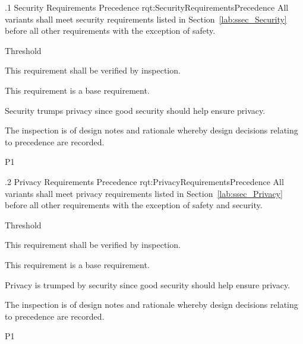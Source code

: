 \ONERQMTV
{\RqtNumberBase.1}
{Security Requirements Precedence}
{rqt:SecurityRequirementsPrecedence}
{All \ThisSystem variants shall meet security requirements listed in Section~\ref{lab:ssec_Security} before all other requirements with the exception of safety.}
{
	\item [Phase 1] Threshold
}
{This requirement shall be verified by inspection.}
{
	\item [N/A] This requirement is a base requirement.
}
{
	\item Security trumps privacy since good security should help ensure privacy.
	\item The inspection is of design notes and rationale whereby design decisions relating to precedence are recorded.
}
{P1}

\ONERQMTV
{\RqtNumberBase.2}
{Privacy Requirements Precedence}
{rqt:PrivacyRequirementsPrecedence}
{All \ThisSystem variants shall meet privacy requirements listed in Section~\ref{lab:ssec_Privacy} before all other requirements with the exception of safety and security.}
{
	\item [Phase 1] Threshold
}
{This requirement shall be verified by inspection.}
{
	\item [N/A] This requirement is a base requirement.
}
{
	\item Privacy is trumped by security since good security should help ensure privacy.
	\item The inspection is of design notes and rationale whereby design decisions relating to precedence are recorded.	
}
{P1}

